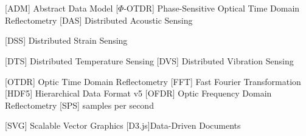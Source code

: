 \cleardoublepage
\chapter*{\listofabbrevname}
{}

\begin{acronym}[KolikMista]
            [ADM]
            {Abstract Data Model}
            [$\Phi$-OTDR]
            {Phase-Sensitive Optical Time Domain Reflectometry}
            [DAS]
            {Distributed Acoustic Sensing}

            [DSS]
            {Distributed Strain Sensing}

            [DTS]
            {Distributed Temperature Sensing}
            [DVS]
            {Distributed Vibration Sensing}
   
            [OTDR]
            {Optic Time Domain Reflectometry}
            [FFT]
            {Fast Fourier Transformation}
            [HDF5]
            {Hierarchical Data Format v5}
            [OFDR]
            {Optic Frequency Domain Reflectometry}
            [SPS]
            {samples per second}

            [SVG]
            {Scalable Vector Graphics}
        [D3.js]{Data-Driven Documents}



\end{acronym}
